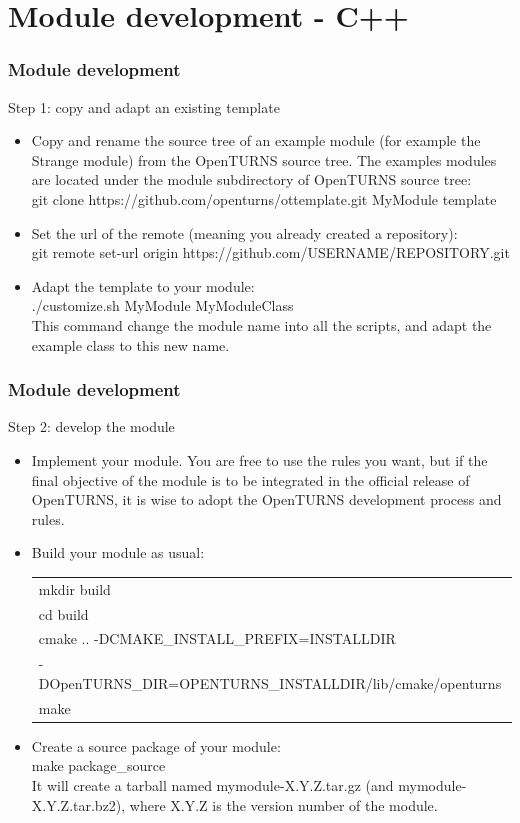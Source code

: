 \documentclass[8pt]{beamer}
\begin{document}
\section[Module development]{Module development - C++}
\begin{frame}
  \frametitle{Module development}
  \begin{block}{Step 1: copy and adapt an existing template}
    \begin{itemize}
    \item Copy and rename the source tree of an example module (for example the Strange module) from the OpenTURNS source tree. The examples modules are located under the module subdirectory of OpenTURNS source tree:\\
      {\ttfamily git clone https://github.com/openturns/ottemplate.git MyModule template }
    \item Set the url of the remote (meaning you already created a repository):\\
      {\ttfamily git remote set-url origin https://github.com/USERNAME/REPOSITORY.git}
    \item Adapt the template to your module:\\
      {\ttfamily ./customize.sh MyModule MyModuleClass}\\
      This command change the module name into all the scripts, and adapt the example class to this new name.
    \end{itemize}
  \end{block}
\end{frame}

\begin{frame}
  \frametitle{Module development}
  \begin{block}{Step 2: develop the module}
    \begin{itemize}
    \item Implement your module. You are free to use the rules you want, but if the final objective of the module is to be integrated in the official release of OpenTURNS, it is wise to adopt the OpenTURNS development process and rules.
    \item Build your module as usual:
      \begin{tabular}{l}
        \ttfamily mkdir build\\
        \ttfamily cd build\\
        \ttfamily cmake .. -DCMAKE\_INSTALL\_PREFIX=INSTALLDIR \\
        \ttfamily -DOpenTURNS\_DIR=OPENTURNS\_INSTALLDIR/lib/cmake/openturns\\
        \ttfamily make
      \end{tabular}
    \item Create a source package of your module:\\
      {\ttfamily make package\_source}\\
      It will create a tarball named mymodule-X.Y.Z.tar.gz (and mymodule-X.Y.Z.tar.bz2), where X.Y.Z is the version number of the module.
    \end{itemize}
  \end{block}
\end{frame}
\end{document}
